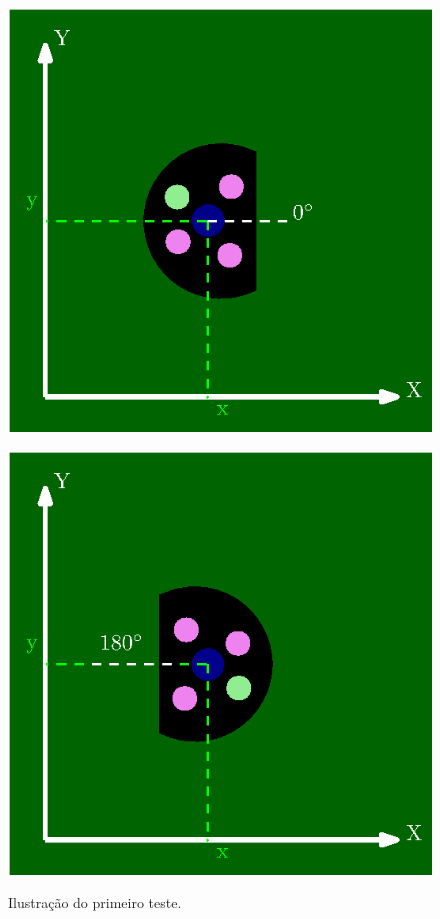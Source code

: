 \documentclass[acronym, symbols]{fei}
\begin{document}
		\begin{figure}[!htb]
			\caption{Ilustração do primeiro teste.}%
			\label{fig:metodologia_teste_1}
			\begin{minipage}{0.45\textwidth}
				\centering
				\includegraphics[width=\linewidth]{teste_1_0_graus.eps}
				\label{fig:metodologia_teste_1_a}
			\end{minipage}
			\hfill
			\begin{minipage}{0.45\textwidth}
				\centering
				\includegraphics[width=\linewidth]{teste_1_180_graus.eps}
				\label{fig:metodologia_teste_1_b}
			\end{minipage}
		\end{figure}
		
\end{document}
